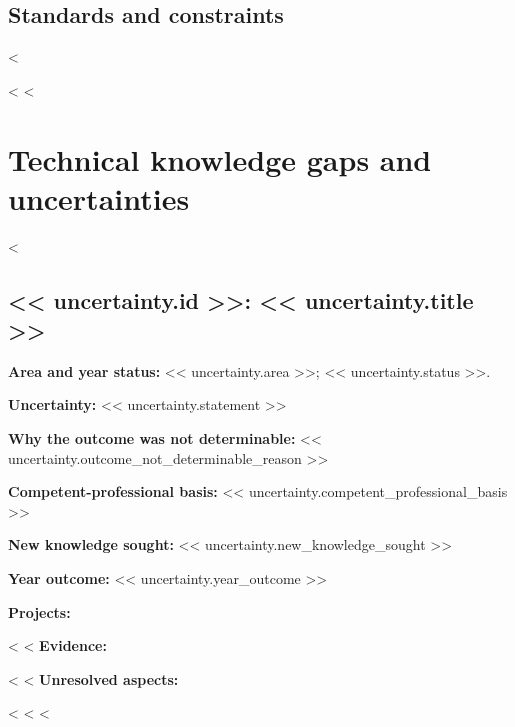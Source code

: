 \documentclass[11pt]{article}
\begin{document}
\subsection{Standards and constraints}
<%
\begin{itemize}<%
<%

\section{Technical knowledge gaps and uncertainties}
<%
\subsection{<< uncertainty.id >>: << uncertainty.title >>}
\textbf{Area and year status:} << uncertainty.area >>; << uncertainty.status >>.

\textbf{Uncertainty:} << uncertainty.statement >>

\textbf{Why the outcome was not determinable:} << uncertainty.outcome_not_determinable_reason >>

\textbf{Competent-professional basis:} << uncertainty.competent_professional_basis >>

\textbf{New knowledge sought:} << uncertainty.new_knowledge_sought >>

\textbf{Year outcome:} << uncertainty.year_outcome >>

\textbf{Projects:}
\begin{itemize}
<%
<%
\textbf{Evidence:}
\begin{itemize}
<%
<%
\textbf{Unresolved aspects:}
\begin{itemize}
<%
<%
<%


\end{itemize}
\end{itemize}
\end{itemize}
\end{itemize}
\end{document}

